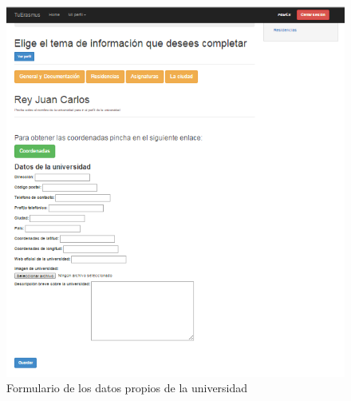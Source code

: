 \begin{figure}[htbp]
	
	\centering
	\includegraphics[scale=0.4]{./Figuras/tuerasmusPages/privatePages/formBasic.png}
	\caption{Formulario de los datos propios de la universidad}
	\label{fig:formBasic}
	
\end{figure}


